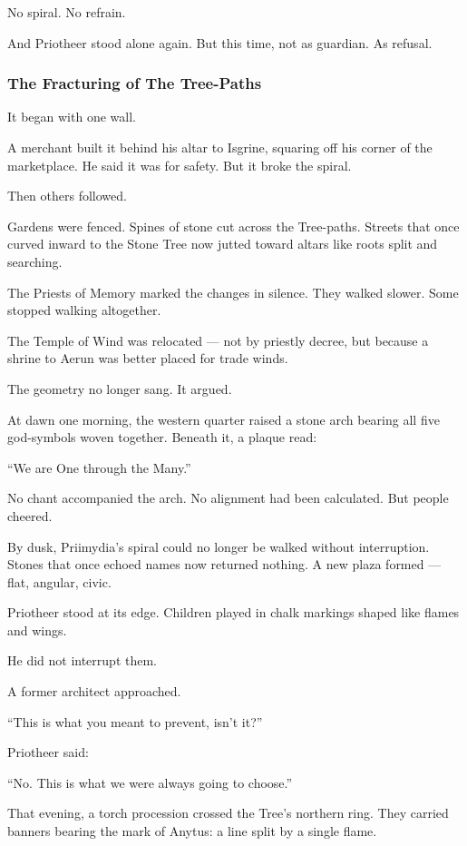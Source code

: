 \documentclass[12pt]{article}
\begin{document}
No spiral.  
No refrain.

And Priotheer stood alone again.  
But this time, not as guardian.  
As refusal.


\dotfill

\subsubsection{The Fracturing of The Tree-Paths}

It began with one wall.

A merchant built it behind his altar to Isgrine,  
squaring off his corner of the marketplace.  
He said it was for safety.  
But it broke the spiral.

Then others followed.

Gardens were fenced.  
Spines of stone cut across the Tree-paths.  
Streets that once curved inward to the Stone Tree  
now jutted toward altars like roots split and searching.

The Priests of Memory marked the changes in silence.  
They walked slower.  
Some stopped walking altogether.

The Temple of Wind was relocated — not by priestly decree,  
but because a shrine to Aerun was better placed for trade winds.

The geometry no longer sang.  
It argued.

At dawn one morning, the western quarter raised a stone arch  
bearing all five god-symbols woven together.  
Beneath it, a plaque read:

 “We are One through the Many.”

No chant accompanied the arch.  
No alignment had been calculated.  
But people cheered.

By dusk, Priimydia’s spiral could no longer be walked without interruption.  
Stones that once echoed names now returned nothing.  
A new plaza formed — flat, angular, civic.

Priotheer stood at its edge.  
Children played in chalk markings shaped like flames and wings.

He did not interrupt them.

A former architect approached.

 “This is what you meant to prevent, isn’t it?”

Priotheer said:

 “No. This is what we were always going to choose.”

That evening, a torch procession crossed the Tree’s northern ring.  
They carried banners bearing the mark of Anytus:  
a line split by a single flame.
\end{document}
